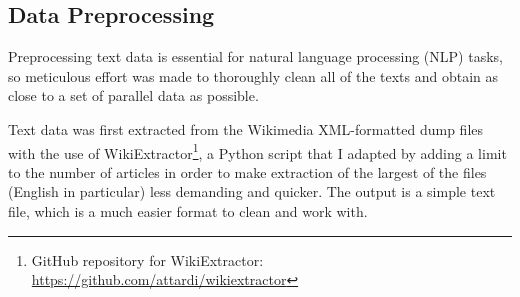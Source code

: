 \documentclass[12pt,a4paper]{article}
\numberwithin{figure}{section}
\numberwithin{table}{section}
\numberwithin{definition}{section}
\begin{document}
\subsection{Data Preprocessing}
\label{ssec:datapreprocessing}

Preprocessing text data is essential for natural language processing (NLP) tasks, so meticulous effort was made to thoroughly clean all of the texts and obtain as close to a set of parallel data as possible.


Text data was first extracted from the Wikimedia XML-formatted dump files with the use of WikiExtractor\footnote{GitHub repository for WikiExtractor: \url{https://github.com/attardi/wikiextractor}}, a Python script \parencite{Attardi2015wikiextractor} that I adapted by adding a limit to the number of articles in order to make extraction of the largest of the files (English in particular) less demanding and quicker. The output is a simple text file, which is a much easier format to clean and work with. 
\end{document}
